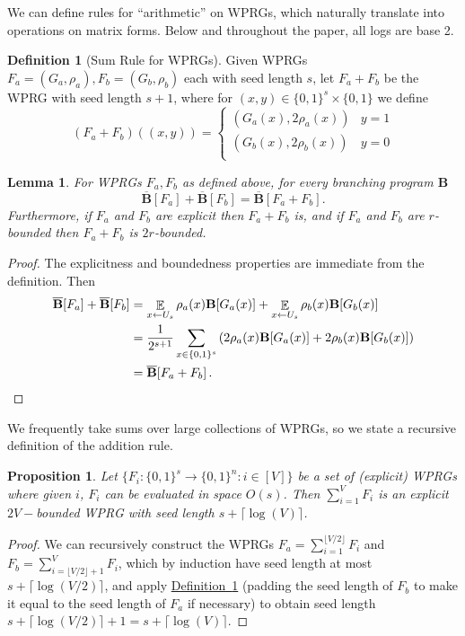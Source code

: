 \documentclass[11pt]{article}
\numberwithin{equation}{section}
\newtheorem{lemma}[theorem]{Lemma}
\newtheorem{proposition}[theorem]{Proposition}
\theoremstyle{definition}
\newtheorem{definition}[theorem]{Definition}
\theoremstyle{plain}
\newcommand{\expref}[2]{\hyperref[#2]{#1~\ref{#2}}}
\newcommand{\zo}{\{0,1\}}
\newcommand{\la}{\leftarrow}
\newcommand{\ra}{\rightarrow}
\DeclareMathOperator*{\E}{\mathbb{E}}
\newcommand{\bp}{{\mathbf{B}}}
\newcommand{\bbp}{\overline{\mathbf{B}}}
\begin{document}
We can define rules for ``arithmetic'' on WPRGs, which naturally translate into operations on matrix forms. Below and throughout the paper, all logs are base 2.

\begin{definition}[Sum Rule for WPRGs]\label{def:addRule}
Given WPRGs $F_a=(G_a,\rho_a),F_b=(G_b,\rho_b)$ each with seed length $s$, let $F_a+F_b$ be the WPRG with seed length $s+1$, where for $(x,y)\in \zo^s\times\zo$ we define
\[
(F_a+F_b)((x,y)) = \begin{cases}
(G_a(x),2\rho_a(x)) & y=1\\
(G_b(x),2\rho_b(x)) & y=0\\
\end{cases}\]
\end{definition}
\begin{lemma}
For WPRGs $F_a,F_b$ as defined above, for every branching program $\bp$
$$\bbp[F_a]+\bbp[F_b]=\bbp[F_a+F_b].$$
Furthermore, if $F_a$ and $F_b$ are explicit then $F_a+F_b$ is, and if $F_a$ and $F_b$ are $r$-bounded then $F_a+F_b$ is $2r$-bounded.
\end{lemma}
\begin{proof}
The explicitness and boundedness properties are immediate from the definition.
Then %
\begin{align*}
    \bbp[F_a]+\bbp[F_b] &= \E_{x\la U_s}\rho_a(x)\bp[G_a(x)]+\E_{x\la U_s}\rho_b(x)\bp[G_b(x)]\\
    &= \frac{1}{2^{s+1}}\sum_{x\in \zo^s}\left(2\rho_a(x)\bp[G_a(x)]+2\rho_b(x)\bp[G_b(x)]\right)\\
    &= \bbp[F_a+F_b]\,.  \qedhere
\end{align*}
\end{proof}
We frequently take sums over large collections of WPRGs, so we state a recursive definition of the addition rule.
\begin{proposition}\label{prop:multiAdd}
Let $\{F_i:\zo^s\ra\zo^n:i\in [V]\}$ be a set of (explicit) WPRGs where given $i$, $F_i$ can be evaluated in space $O(s)$. Then
$\sum_{i=1}^VF_i$
is an explicit $2V-$bounded WPRG with seed length $s+\lceil\log(V)\rceil$.
\end{proposition}
\begin{proof}
We can recursively construct the WPRGs $F_a=\sum_{i=1}^{\lfloor V/2\rfloor}F_i$ and $F_b=\sum_{i=\lfloor V/2\rfloor+1}^{V}F_i$, which by induction have seed length at most $s+\lceil \log(V/2)\rceil$, and apply \expref{Definition}{def:addRule} (padding the seed length of $F_b$ to make it equal to the seed length of $F_a$ if necessary) to obtain seed length $s+\lceil \log(V/2)\rceil +1=s+\lceil \log(V)\rceil$.
\end{proof}
\end{document}
